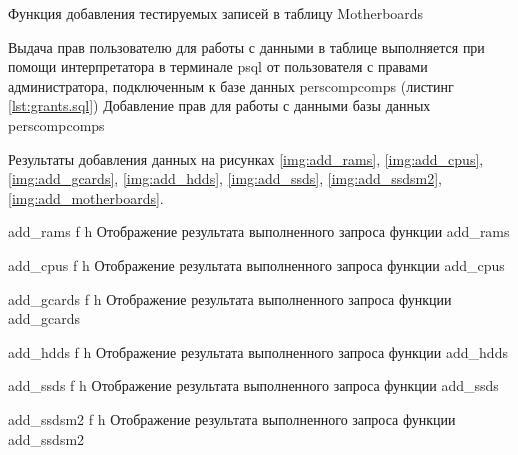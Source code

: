 {Функция добавления тестируемых записей в таблицу Motherboards}

Выдача прав пользователю для работы с данными в таблице выполняется при помощи интерпретатора в терминале psql от пользователя с правами администратора, подключенным к базе данных perscompcomps (листинг \ref{lst:grants.sql})
{Добавление прав для работы с данными базы данных perscompcomps}

Результаты добавления данных на рисунках 
\ref{img:add_rams}, 
\ref{img:add_cpus}, 
\ref{img:add_gcards}, 
\ref{img:add_hdds}, 
\ref{img:add_ssds}, 
\ref{img:add_ssdsm2}, 
\ref{img:add_motherboards}.

{add_rams} %
{f} %
{h} %
{\textwidth} %
{Отображение результата выполненного запроса функции add\_rams} %

{add_cpus} %
{f} %
{h} %
{\textwidth} %
{Отображение результата выполненного запроса функции add\_cpus} %

{add_gcards} %
{f} %
{h} %
{\textwidth} %
{Отображение результата выполненного запроса функции add\_gcards} %

{add_hdds} %
{f} %
{h} %
{\textwidth} %
{Отображение результата выполненного запроса функции add\_hdds} %

{add_ssds} %
{f} %
{h} %
{\textwidth} %
{Отображение результата выполненного запроса функции add\_ssds} %

{add_ssdsm2} %
{f} %
{h} %
{\textwidth} %
{Отображение результата выполненного запроса функции add\_ssdsm2} %


